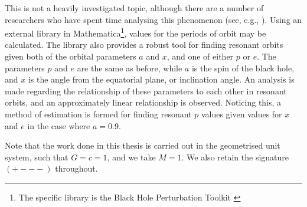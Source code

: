 This is not a heavily investigated topic, although there are a number of researchers who have spent time analysing this phenomenon (see, e.g., \cite{brinkResonance, brinkKerrResonance, ruangsriCensusReso, meentEMRIReso}).
Using an external library in Mathematica\footnote{The specific library is the Black Hole Perturbation Toolkit \cite{BHPToolkit}}, values for the periods of orbit may be calculated.
The library also provides a robust tool for finding resonant orbits given both of the orbital parameters $a$ and $x$, and one of either $p$ or $e$.
The parameters $p$ and $e$ are the same as before, while $a$ is the spin of the black hole, and $x$ is the angle from the equatorial plane, or inclination angle.
An analysis is made regarding the relationship of these parameters to each other in resonant orbits, and an approximately linear relationship is observed.
Noticing this, a method of estimation is formed for finding resonant $p$ values given values for $x$ and $e$ in the case where $a=0.9$.

Note that the work done in this thesis is carried out in the geometrised unit system, such that $G=c=1$, and we take $M=1$. We also retain the signature $(+---)$ throughout.